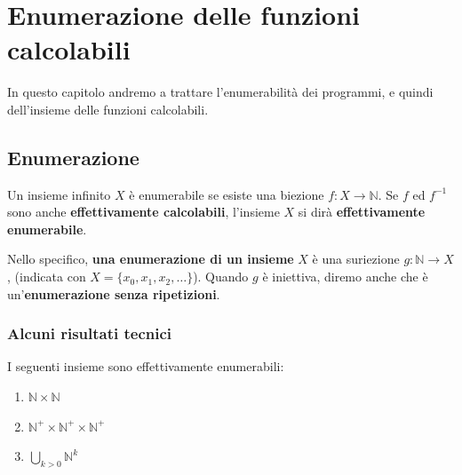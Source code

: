 	\chapter{Enumerazione delle funzioni calcolabili}
	In questo capitolo andremo a trattare l'enumerabilità dei programmi, e quindi dell'insieme delle funzioni calcolabili.  
	
	\section{Enumerazione}
	Un insieme infinito $X$ è enumerabile se esiste una biezione $f: X \to \mathbb{N}$. Se $f$ ed $f^{-1}$ sono anche \textbf{effettivamente calcolabili}, l'insieme $X$ si dirà \textbf{effettivamente enumerabile}.
	
	Nello specifico, \textbf{una enumerazione di un insieme} $X$ è una suriezione $g: \mathbb{N} \to X$, (indicata con $X = \{x_0,x_1,x_2, \dots\}$). Quando $g$ è iniettiva, diremo anche che è un'\textbf{enumerazione senza ripetizioni}. 
	
	\subsection{Alcuni risultati tecnici}
	
	I seguenti insieme sono effettivamente enumerabili:
	
	\begin{enumerate}
		\item $\mathbb{N}\times\mathbb{N}$
		\item $\mathbb{N}^+\times\mathbb{N}^+\times\mathbb{N}^+$
		\item $\bigcup_{k>0}\mathbb{N}^k$
	\end{enumerate}
	
